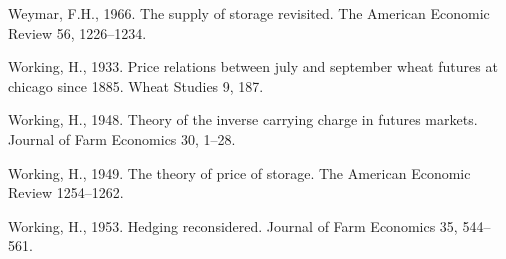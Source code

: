 \documentclass[]{elsarticle} %
\begin{document}
\leavevmode\hypertarget{ref-weymar_supply_1966}{}%
Weymar, F.H., 1966. The supply of storage revisited. The American Economic Review 56, 1226--1234.

\leavevmode\hypertarget{ref-working_price_1933}{}%
Working, H., 1933. Price relations between july and september wheat futures at chicago since 1885. Wheat Studies 9, 187.

\leavevmode\hypertarget{ref-working_theory_1948}{}%
Working, H., 1948. Theory of the inverse carrying charge in futures markets. Journal of Farm Economics 30, 1--28.

\leavevmode\hypertarget{ref-working_theory_1949}{}%
Working, H., 1949. The theory of price of storage. The American Economic Review 1254--1262.

\leavevmode\hypertarget{ref-working_hedging_1953}{}%
Working, H., 1953. Hedging reconsidered. Journal of Farm Economics 35, 544--561.
\end{document}
